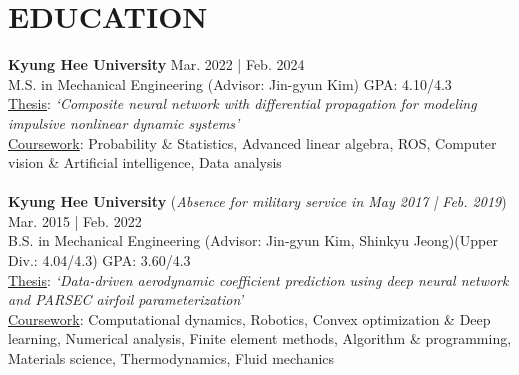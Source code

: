 \documentclass[a4paper,10pt]{extarticle}
\begin{document}
\section*{EDUCATION}
\noindent
\textbf{Kyung Hee University} \hfill Mar. 2022 | Feb. 2024\\ %
M.S. in Mechanical Engineering {\small(Advisor: Jin-gyun Kim)} \hfill GPA: 4.10/4.3\\ %
\underline{Thesis}: \textsl{{\small `Composite neural network with differential propagation for modeling impulsive nonlinear dynamic systems'}}\\
{\small\underline{Coursework}: Probability \& Statistics, Advanced linear algebra, ROS, Computer vision \& Artificial intelligence, Data analysis}\\
\\
\textbf{Kyung Hee University} \hfill{\footnotesize(\textsl{Absence for military service in May 2017 | Feb. 2019})}\hspace*{0.25cm} Mar. 2015 | Feb. 2022\\ %
B.S. in Mechanical Engineering {\small(Advisor: Jin-gyun Kim, Shinkyu Jeong)}\hfill {(Upper Div.: 4.04/4.3)} GPA: 3.60/4.3\\ %
\underline{Thesis}: {\small\textsl{{`Data-driven aerodynamic coefficient prediction using deep neural network and PARSEC airfoil parameterization'}}}\\  %
{\small\underline{Coursework}: Computational dynamics, Robotics, Convex optimization \& Deep learning, Numerical analysis, Finite element methods, Algorithm \& programming, Materials science, Thermodynamics, Fluid mechanics}

\end{document}
